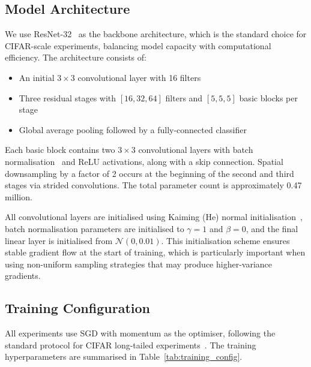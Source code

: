 \documentclass[12pt,a4paper]{article}
\begin{document}
\subsection{Model Architecture}

We use ResNet-32~\citep{he2016deep} as the backbone architecture, which is the standard choice for CIFAR-scale experiments, balancing model capacity with computational efficiency. The architecture consists of:
\begin{itemize}
    \item An initial $3 \times 3$ convolutional layer with 16 filters
    \item Three residual stages with $[16, 32, 64]$ filters and $[5, 5, 5]$ basic blocks per stage
    \item Global average pooling followed by a fully-connected classifier
\end{itemize}

Each basic block contains two $3 \times 3$ convolutional layers with batch normalisation~\citep{ioffe2015batch} and ReLU activations, along with a skip connection. Spatial downsampling by a factor of 2 occurs at the beginning of the second and third stages via strided convolutions. The total parameter count is approximately 0.47 million.

All convolutional layers are initialised using Kaiming (He) normal initialisation~\citep{he2015delving}, batch normalisation parameters are initialised to $\gamma = 1$ and $\beta = 0$, and the final linear layer is initialised from $\mathcal{N}(0, 0.01)$. This initialisation scheme ensures stable gradient flow at the start of training, which is particularly important when using non-uniform sampling strategies that may produce higher-variance gradients.

\subsection{Training Configuration}
\label{subsec:training_config}
All experiments use SGD with momentum as the optimiser, following the standard protocol for CIFAR long-tailed experiments~\citep{cao2019learning}. The training hyperparameters are summarised in Table~\ref{tab:training_config}.
\end{document}
